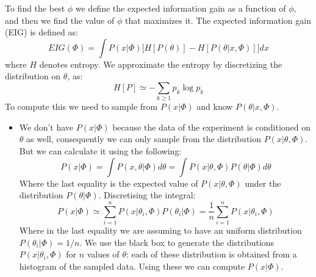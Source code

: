 \documentclass[10pt,journal,compsoc]{IEEEtran}
\begin{document}
To find the best $\phi$ we define the expected information gain as a function of $\phi$, and then we find the value of $\phi$ that maximizes it. The expected information gain (EIG) is defined as:
\begin{equation}\label{infGain}
EIG(\Phi) =\int P(x|\Phi)\Big[ H[P(\theta)]-H[P(\theta|x,\Phi)]\Big]dx
\end{equation}
where $H$ denotes entropy. We approximate the entropy by discretizing the distribution on $\theta$, as:
\begin{equation}
H[P]\simeq-\sum_{k\geq 1}p_k \log{p_k}
\end{equation}
To compute this we need to sample from $ P(x|\Phi)$ and know $P(\theta|x,\Phi)$.
\begin{itemize}
\item We don't have $P(x|\Phi)$ because the data of the experiment is conditioned on $\theta$ as well, consequently we can only sample from the distribution $P(x |\theta,\Phi)$. But we can calculate it using the following:
\begin{equation}
P(x|\Phi) = \int P(x,\theta | \Phi)d \theta = 
\int P(x| \theta , \Phi) P(\theta | \Phi)d \theta 
\end{equation}
Where the last equality is the expected value of $P(x| \theta , \Phi)$ under the distribution $P(\theta | \Phi)$.
Discretising the integral:
\begin{equation}
P(x|\Phi) \simeq \sum_{i=1}^{n}  P(x |\theta_i,\Phi)P(\theta_i | \Phi) = \frac{1}{n} \sum_{i=1}^{n}  P(x |\theta_i,\Phi) 
\end{equation}
Where in the last equality we are assuming to have an uniform distribution $P(\theta_i | \Phi) =1/n$.
We use the black box to generate the distributions $P(x |\theta_i,\Phi) $ for $n$ values of $\theta$:
each of these distribution is obtained from a histogram of the sampled data.
Using these we can compute $P(x|\Phi)$. \\


\end{itemize}
\end{document}
